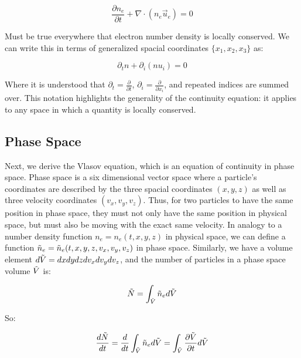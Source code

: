 \documentclass[11pt]{article}
\begin{document}
\begin{equation}
    \frac{\partial{n_e}}{\partial t} + \nabla \cdot (n_e \vec{u}_e) = 0
\end{equation}

Must be true everywhere that electron number density is locally conserved. We can write this in terms of generalized spacial coordinates $\{x_1,x_2,x_3\}$ as:

\begin{equation}
    \partial_t{n} + \partial_i{(n u_i)} = 0
\end{equation}

Where it is understood that $\partial_t = \frac{\partial}{\partial t}$, $\partial_i = \frac{\partial}{\partial x_i}$, and repeated indices are summed over. This notation highlights the generality of the continuity equation: it applies to any space in which a quantity is locally conserved. 

\subsection{Phase Space}

Next, we derive the Vlasov equation, which is an equation of continuity in phase space. Phase space is a six dimensional vector space where a particle's coordinates are described by the three spacial coordinates $(x,y,z)$ as well as three velocity coordinates $(v_x,v_y,v_z)$. Thus, for two particles to have the same position in phase space, they must not only have the same position in physical space, but must also be moving with the exact same velocity. In analogy to a number density function $n_e=n_e(t,x,y,z)$ in physical space, we can define a function $\Tilde{n}_e=\Tilde{n}_e(t,x,y,z,v_x,v_y,v_z)$ in phase space. Similarly, we have a volume element $d\Tilde{V} = dxdydzdv_xdv_ydv_z$, and the number of particles in a phase space volume $\Tilde{V}$ is:

\begin{equation}
    \Tilde{N} = \int_{\Tilde{V}} \Tilde{n}_e d\Tilde{V}
\end{equation}

So:

\begin{equation}
    \frac{d\Tilde{N}}{dt} = \frac{d}{dt}\int_{\Tilde{V}} \Tilde{n}_e d\Tilde{V} = \int_{\Tilde{V}}\frac{\partial \Tilde{V}}{\partial t} d\Tilde{V}
\end{equation}
\end{document}
